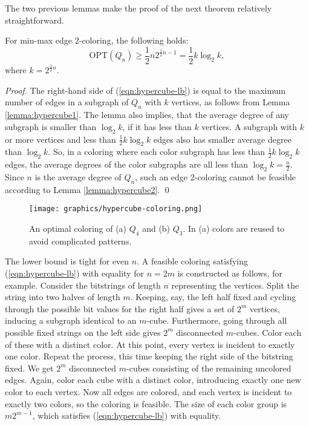 \documentclass[runningheads, a4paper]{llncs}
\begin{document}
The two previous lemmas make the proof of the next theorem relatively straightforward.

\begin{theorem}\label{theorem:hypercube}
For min-max edge 2-coloring, the following holds:
\begin{equation}\label{eqn:hypercube-lb}
\textrm{OPT}(Q_{n}) \geq \frac{1}{2}n 2^{\frac{1}{2}n - 1} = \frac{1}{2} k \log_2 k,
\end{equation}
where $k = 2^{\frac{1}{2}n}$.
\end{theorem}
\begin{proof}
The right-hand side of (\ref{eqn:hypercube-lb}) is equal to the maximum number of edges in a subgraph of $Q_n$ with $k$ vertices, as follows from Lemma \ref{lemma:hypercube1}. The lemma also implies, that the average degree of any subgraph is smaller than $\log_2 k$, if it has less than $k$ vertices. A subgraph with $k$ or more vertices and less than $\frac{1}{2} k \log_2 k$ edges also has smaller average degree than $\log_2 k$. So, in a coloring where each color subgraph has less than $\frac{1}{2} k \log_2 k$ edges, the average degrees of the color subgraphs are all less than $\log_2 k = \frac{n}{2}$. Since $n$ is the average degree of $Q_n$, such an edge 2-coloring cannot be feasible according to Lemma \ref{lemma:hypercube2}. \qed
\end{proof}

\begin{figure}[htb]
\centering \texttt{[image: graphics/hypercube-coloring.png]}
\caption{An optimal coloring of (a) $Q_4$ and (b) $Q_3$. In (a) colors are reused to avoid complicated patterns.}\label{img:hypercube-coloring}
\end{figure}

The lower bound is tight for even $n$. A feasible coloring satisfying (\ref{eqn:hypercube-lb}) with equality for $n = 2m$ is constructed as follows, for example. Consider the bitstrings of length $n$ representing the vertices. Split the string into two halves of length $m$. Keeping, say, the left half fixed and cycling through the possible bit values for the right half gives a set of $2^m$ vertices, inducing a subgraph identical to an $m$-cube. Furthermore, going through all possible fixed strings on the left side gives $2^m$ disconnected $m$-cubes. Color each of these with a distinct color. At this point, every vertex is incident to exactly one color. Repeat the process, this time keeping the right side of the bitstring fixed. We get $2^m$ disconnected $m$-cubes consisting of the remaining uncolored edges. Again, color each cube with a distinct color, introducing exactly one new color to each vertex. Now all edges are colored, and each vertex is incident to exactly two colors, so the coloring is feasible. The size of each color group is $m2^{m-1}$, which satisfies (\ref{eqn:hypercube-lb}) with equality. 
\end{document}
